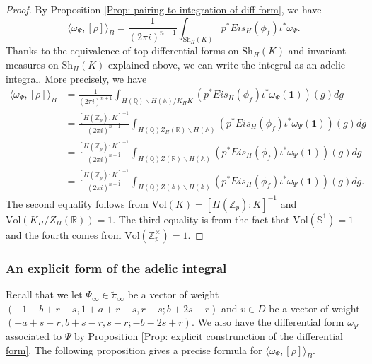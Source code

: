 \documentclass[11pt, a4paper]{amsart}
\theoremstyle{plain}
\theoremstyle{definition}
\numberwithin{equation}{section}
\def\AAA{\mathbb{A}}
\def\QQ{\mathbb{Q}}
\def\RR{\mathbb{R}}
\def\ZZ{\mathbb{Z}}
\newcommand{\Zp}{\ZZ_p}
\newcommand{\Sh}{\mathrm{Sh}}
\begin{document}
\begin{proof}
    By Proposition \ref{Prop: pairing to integration of diff form}, we have 
    \begin{equation*}
         \langle \omega_{\Psi}, [\rho] \rangle_{B} = \frac{1}{(2\pi i)^{n + 1}} \int_{\Sh_{H}(K)} p^{*} Eis_{H}(\phi_f) \iota^{*} \omega_{\Psi}. 
    \end{equation*}
    Thanks to the equivalence of top differential forms on $\Sh_{H}(K)$ and invariant measures on $\Sh_{H}(K)$ explained above, we can write the integral as an adelic integral. More precisely, we have 
    \begin{align*}
        \langle \omega_{\Psi}, [\rho] \rangle_{B} &= \frac{1}{(2\pi i)^{n + 1}} \int_{H(\QQ) \backslash H(\AAA) / K_{H} K}(p^{*} Eis_{H}(\phi_f) \iota^{*} \omega_{\Psi}(\mathbf{1}))(g) dg \\
                                                  &= \frac{[H(\Zp): K]^{-1}}{(2\pi i)^{n + 1}} \int_{H(\QQ) Z_{H}(\RR) \backslash H(\AAA) }(p^{*} Eis_{H}(\phi_f) \iota^{*} \omega_{\Psi}(\mathbf{1}))(g) dg \\    
                                                  &= \frac{[H(\Zp): K]^{-1}}{(2\pi i)^{n + 1}} \int_{H(\QQ) Z(\RR) \backslash H(\AAA) }(p^{*} Eis_{H}(\phi_f) \iota^{*} \omega_{\Psi}(\mathbf{1}))(g) dg \\
                                                   &= \frac{[H(\Zp): K]^{-1}}{(2\pi i)^{n + 1}} \int_{H(\QQ) Z(\AAA) \backslash H(\AAA) }(p^{*} Eis_{H}(\phi_f) \iota^{*} \omega_{\Psi}(\mathbf{1}))(g) dg. 
    \end{align*}
    The second equality follows from $\mathrm{Vol}(K) = [H(\Zp): K]^{-1}$ and $\mathrm{Vol}(K_H / Z_{H} (\RR)) = 1$. The third equality is from the fact that $\mathrm{Vol}(\mathbb{S}^{1}) = 1$ and the fourth comes from $\mathrm{Vol}(\Zp^{\times}) = 1$. 
\end{proof}

\subsubsection{An explicit form of the adelic integral}

\par Recall that we let $\Psi_{\infty} \in \tilde{\pi}_{\infty}$ be a vector of weight $(-1 - b + r - s, 1 + a + r - s, r - s; b + 2s -r)$ and $v \in D$ be a vector of weight $(-a + s - r, b + s - r, s - r; -b - 2s + r)$. We also have the differential form $\omega_{\Psi}$ associated to $\Psi$ by Proposition \ref{Prop: explicit construnction of the differential form}. The following proposition gives a precise formula for $\langle \omega_{\Psi}, [\rho] \rangle_{B}$. 
\end{document}
